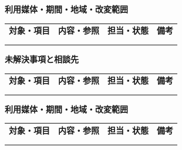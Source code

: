 \documentclass[11pt,a4paper]{article}
\begin{document}
\par{}\noindent\textbf{利用媒体・期間・地域・改変範囲}\par\vspace{1mm}
{\fontsize{8.5}{13}\selectfont
\begin{tabularx}{\linewidth}{@{}XXXX@{}}
\textbf{対象・項目} & \textbf{内容・参照} & \textbf{担当・状態} & \textbf{備考}\\[2mm]
\strut & \strut & \strut & \strut\\[5mm]
\strut & \strut & \strut & \strut\\[5mm]
\end{tabularx}
}\vspace{2mm}\par
{}
\par{}\noindent\textbf{未解決事項と相談先}\par\vspace{1mm}
{\fontsize{8.5}{13}\selectfont
\begin{tabularx}{\linewidth}{@{}XXXX@{}}
\textbf{対象・項目} & \textbf{内容・参照} & \textbf{担当・状態} & \textbf{備考}\\[2mm]
\strut & \strut & \strut & \strut\\[5mm]
\strut & \strut & \strut & \strut\\[5mm]
\end{tabularx}
}\vspace{2mm}\par
{}
\par{}\noindent\textbf{利用媒体・期間・地域・改変範囲}\par\vspace{1mm}
{\fontsize{8.5}{13}\selectfont
\begin{tabularx}{\linewidth}{@{}XXXX@{}}
\textbf{対象・項目} & \textbf{内容・参照} & \textbf{担当・状態} & \textbf{備考}\\[2mm]
\strut & \strut & \strut & \strut\\[5mm]
\strut & \strut & \strut & \strut\\[5mm]
\end{tabularx}
}\vspace{2mm}\par
\end{document}
